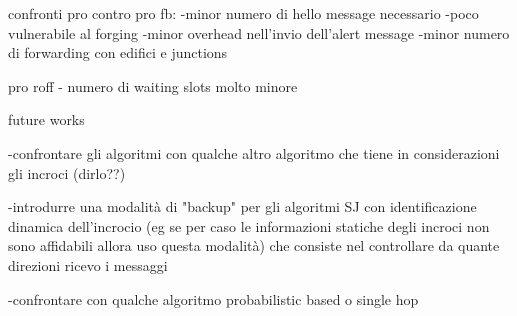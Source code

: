 


confronti pro contro
pro fb:
-minor numero di hello message necessario
-poco vulnerabile al forging
-minor overhead nell'invio dell'alert message
-minor numero di forwarding con edifici e junctions


pro roff
- numero di waiting slots molto minore





future works

-confrontare gli algoritmi con qualche altro algoritmo che tiene in considerazioni gli incroci (dirlo??)

-introdurre una modalità di "backup" per gli algoritmi SJ con identificazione dinamica dell'incrocio (eg se per caso le informazioni statiche degli incroci non sono affidabili allora uso questa modalità) che consiste nel controllare da quante direzioni ricevo i messaggi

-confrontare con qualche algoritmo probabilistic based o single hop
